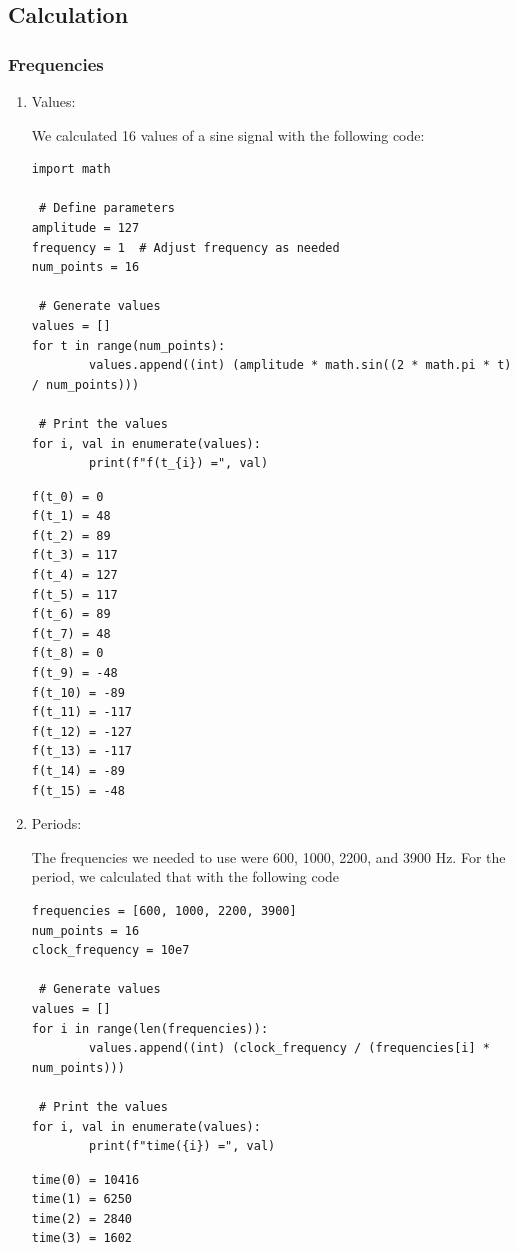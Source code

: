 \documentclass[a4paper, 12pt]{article}
\begin{document}
\subsection{Calculation}
\label{sec:org08c0ae7}

\subsubsection{Frequencies}
\label{sec:org4895a3e}
\begin{enumerate}
\item Values:
\label{sec:org4c511d0}

We calculated 16 values of a sine signal with the following code:

\begin{verbatim}
import math

 # Define parameters
amplitude = 127
frequency = 1  # Adjust frequency as needed
num_points = 16

 # Generate values
values = []
for t in range(num_points):
        values.append((int) (amplitude * math.sin((2 * math.pi * t) / num_points)))

 # Print the values
for i, val in enumerate(values):
        print(f"f(t_{i}) =", val)
\end{verbatim}

\begin{verbatim}
f(t_0) = 0
f(t_1) = 48
f(t_2) = 89
f(t_3) = 117
f(t_4) = 127
f(t_5) = 117
f(t_6) = 89
f(t_7) = 48
f(t_8) = 0
f(t_9) = -48
f(t_10) = -89
f(t_11) = -117
f(t_12) = -127
f(t_13) = -117
f(t_14) = -89
f(t_15) = -48
\end{verbatim}
\item Periods:
\label{sec:orge9e8149}

The frequencies we needed to use were 600, 1000, 2200, and 3900 Hz. For the period, we calculated that with the following code

\begin{verbatim}
frequencies = [600, 1000, 2200, 3900]
num_points = 16
clock_frequency = 10e7

 # Generate values
values = []
for i in range(len(frequencies)):
        values.append((int) (clock_frequency / (frequencies[i] * num_points)))

 # Print the values
for i, val in enumerate(values):
        print(f"time({i}) =", val)
\end{verbatim}

\begin{verbatim}
time(0) = 10416
time(1) = 6250
time(2) = 2840
time(3) = 1602
\end{verbatim}
\end{enumerate}
\end{document}
